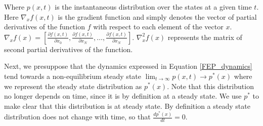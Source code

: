 Where $p(x,t)$ is the instantaneous distribution over the states at a given time $t$. 
Here $\nabla_x f(x,t)$ is the gradient function and simply denotes the vector of partial derivatives of the function $f$ with respect to each element of the vector $x$. $\nabla_x f(x) = [ \frac{\partial f(x,t)}{\partial x_0}, \frac{\partial f(x,t)}{\partial x_N}, \dots , \frac{\partial f(x,t)}{\partial x_N}]$. $\nabla^2_x f(x)$ represents the matrix of second partial derivatives of the function.

Next, we presuppose that the dynamics expressed in Equation \ref{FEP_dynamics} tend towards a non-equilibrium steady state $\lim_{t \to \infty} p(x,t) \to p^*(x)$ where we represent the steady state distribution as $p^*(x)$. Note that this distribution no longer depends on time, since it is by definition at a steady state. We use $p^*$ to make clear that this distribution is at steady state. By definition a steady state distribution does not change with time, so that $\frac{dp^*(x)}{dt} = 0$.

